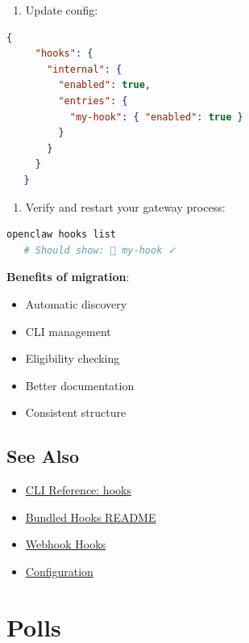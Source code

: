 \begin{enumerate}
  \item Update config:
\end{enumerate}


\begin{lstlisting}[language=json]
   {
     "hooks": {
       "internal": {
         "enabled": true,
         "entries": {
           "my-hook": { "enabled": true }
         }
       }
     }
   }
\end{lstlisting}


\begin{enumerate}
  \item Verify and restart your gateway process:
\end{enumerate}


\begin{lstlisting}[language=bash]
   openclaw hooks list
   # Should show: 🎯 my-hook ✓
\end{lstlisting}


\textbf{Benefits of migration}:

\begin{itemize}
  \item Automatic discovery
  \item CLI management
  \item Eligibility checking
  \item Better documentation
  \item Consistent structure
\end{itemize}


\subsection{See Also}


\begin{itemize}
  \item \href{/cli/hooks}{CLI Reference: hooks}
  \item \href{https://github.com/openclaw/openclaw/tree/main/src/hooks/bundled}{Bundled Hooks README}
  \item \href{/automation/webhook}{Webhook Hooks}
  \item \href{/gateway/configuration\#hooks}{Configuration}
\end{itemize}



\clearpage

\section{Polls}


